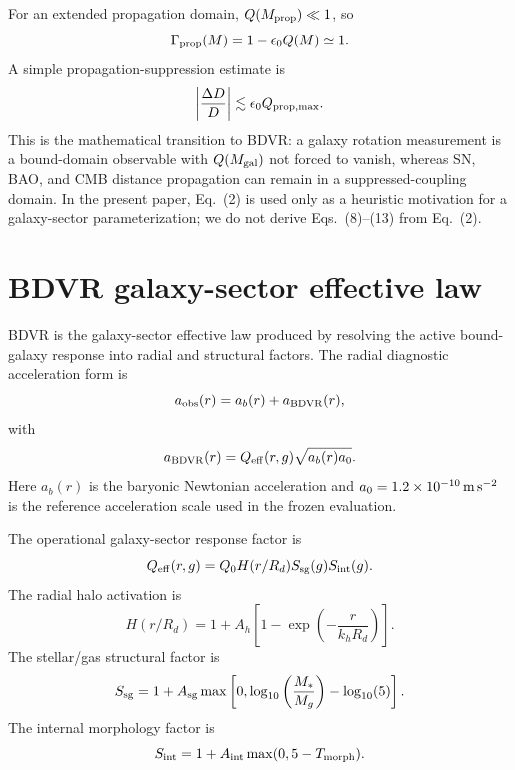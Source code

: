 \documentclass[aps,prd,preprint,nofootinbib,superscriptaddress]{revtex4-2}
\begin{document}
For an extended propagation domain, $Q(M_{\rm prop})\ll1$, so
\begin{equation}
\Gamma_{\rm prop}(M)=1-\epsilon_0 Q(M)\simeq1.
\end{equation}
A simple propagation-suppression estimate is
\begin{equation}
\left|\frac{\Delta D}{D}\right|\lesssim \epsilon_0 Q_{\rm prop,max} .
\end{equation}
This is the mathematical transition to BDVR: a galaxy rotation measurement is a bound-domain observable with $Q(M_{\rm gal})$ not forced to vanish, whereas SN, BAO, and CMB distance propagation can remain in a suppressed-coupling domain. In the present paper, Eq.~(2) is used only as a heuristic motivation for a galaxy-sector parameterization; we do not derive Eqs.~(8)--(13) from Eq.~(2).

\section{BDVR galaxy-sector effective law}

BDVR is the galaxy-sector effective law produced by resolving the active bound-galaxy response into radial and structural factors. The radial diagnostic acceleration form is
\begin{equation}
a_{\rm obs}(r) = a_b(r) + a_{\rm BDVR}(r),
\end{equation}
with
\begin{equation}
a_{\rm BDVR}(r) = Q_{\rm eff}(r,g)\sqrt{a_b(r)a_0} .
\end{equation}
Here $a_b(r)$ is the baryonic Newtonian acceleration and $a_0=1.2\times10^{-10}\,{\rm m\,s^{-2}}$ is the reference acceleration scale used in the frozen evaluation.

The operational galaxy-sector response factor is
\begin{equation}
Q_{\rm eff}(r,g) = Q_0 H(r/R_d) S_{\rm sg}(g) S_{\rm int}(g).
\end{equation}
The radial halo activation is
\begin{equation}
H(r/R_d) = 1 + A_h \left[1 - \exp\left(-\frac{r}{k_h R_d}\right)\right].
\end{equation}
The stellar/gas structural factor is
\begin{equation}
S_{\rm sg} =
1 + A_{\rm sg}\max\left[0,\log_{10}\left(\frac{M_*}{M_g}\right)-\log_{10}(5)\right].
\end{equation}
The internal morphology factor is
\begin{equation}
S_{\rm int} = 1 + A_{\rm int}\max(0,5-T_{\mathrm{morph}}).
\end{equation}
\end{document}
